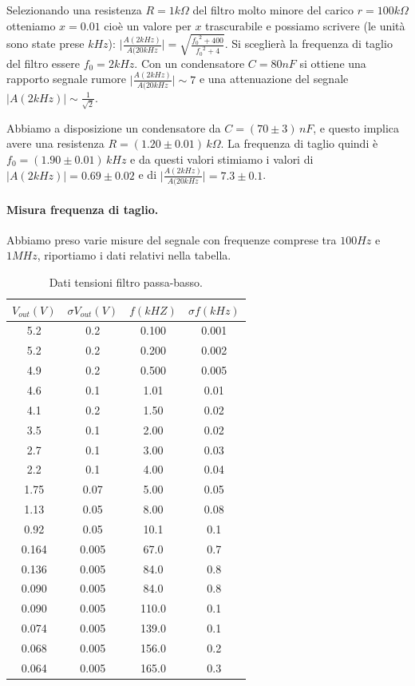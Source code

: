 \documentclass[10pt,a4paper]{article}
\begin{document}
Selezionando una resistenza $R = 1 k\Omega$ del filtro molto minore del carico $r = 100 k\Omega$ otteniamo $x = 0.01$ cioè un valore per $x$ trascurabile e possiamo scrivere (le unità sono state prese $kHz$): 
$\vert \frac{A(2 kHz)}{A(20 kHz} \vert = \sqrt{\frac{{f_0}^2  + 400}{{f_0}^2 + 4}}$. Si sceglierà la frequenza di taglio del filtro essere $f_0 = 2kHz$. Con un condensatore $C = 80 nF$ si ottiene una rapporto segnale rumore $\vert \frac{A(2 kHz)}{A(20 kHz} \vert \sim 7$ e una attenuazione del segnale $\vert A(2 kHz) \vert \sim \frac{1}{\sqrt{2}}$.

Abbiamo a disposizione un condensatore da $C = (70 \pm 3) \, nF$, e questo implica avere una resistenza $R = (1.20 \pm 0.01) \, k\Omega$.
La frequenza di taglio quindi è $f_0 = (1.90 \pm 0.01) \, kHz$ e da questi valori stimiamo i valori di $\vert A(2 kHz) \vert = 0.69 \pm 0.02 $ e di $\vert \frac{A(2 kHz)}{A(20 kHz} \vert = 7.3 \pm 0.1$.

\paragraph{Misura frequenza di taglio.}
Abbiamo preso varie misure del segnale con frequenze comprese tra $100Hz$ e $1MHz$, riportiamo i dati relativi nella tabella.

\begin{table}[h]
\centering
\begin{tabular}{|c|c|c|c|}
\hline 
$V_{out} (V)$  &  $\sigma V_{out} (V)$ &  $f(kHZ)$ & $\sigma f(kHz)$ \\ 
\hline 
5.2 & 0.2 & 0.100 & 0.001 \\ 
\hline 
5.2 & 0.2 & 0.200 & 0.002 \\ 
\hline 
4.9 & 0.2 & 0.500 & 0.005 \\ 
\hline 
4.6 & 0.1 & 1.01 & 0.01 \\ 
\hline 
4.1 & 0.2 & 1.50 & 0.02 \\ 
\hline 
3.5 & 0.1 & 2.00 & 0.02 \\ 
\hline 
2.7 & 0.1 & 3.00 & 0.03 \\ 
\hline 
2.2 & 0.1 & 4.00 & 0.04 \\ 
\hline 
1.75 & 0.07 & 5.00 & 0.05 \\ 
\hline 
1.13 & 0.05 & 8.00 & 0.08 \\ 
\hline 
0.92 & 0.05 & 10.1 & 0.1 \\ 
\hline 
0.164 & 0.005 & 67.0 & 0.7 \\ 
\hline 
0.136 & 0.005 & 84.0 & 0.8 \\ 
\hline 
0.090 & 0.005 & 84.0 & 0.8 \\ 
\hline 
0.090 & 0.005 & 110.0 & 0.1 \\ 
\hline 
0.074 & 0.005 & 139.0 & 0.1 \\ 
\hline 
0.068 & 0.005 & 156.0 & 0.2 \\ 
\hline 
0.064 & 0.005 & 165.0 & 0.3 \\ 
\hline 
\end{tabular} 
\caption{Dati tensioni filtro passa-basso.}
\end{table}
\end{document}
